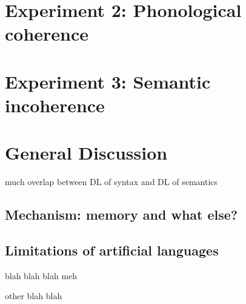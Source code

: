 \documentclass[man,floatsintext]{apa6}
\begin{document}
\section{Experiment 2: Phonological coherence}

\section{Experiment 3: Semantic incoherence}

\section{General Discussion}

much overlap between DL of syntax and DL of semantics

\subsection{Mechanism: memory and what else?}

\subsection{Limitations of artificial languages} 
blah blah blah \cite{Imai:2008ee} meh

other blah blah \cite{Foss:1966jl}

\nocite{*}
\newpage


\end{document}
